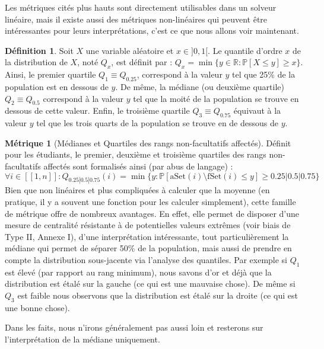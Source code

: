 \documentclass{rapport}
\theoremstyle{definition}
\newtheorem{definition}{Définition}
\theoremstyle{remark}
\theoremstyle{plain}
\theoremstyle{definition}
\newtheorem*{metric}{Métrique}
\theoremstyle{remark}
\newcommand{\llbracket}{[\![}
\newcommand{\rrbracket}{]\!]}
\begin{document}
Les métriques cités plus hauts sont directement utilisables dans un solveur linéaire, mais il existe aussi des métriques non-linéaires qui peuvent être intéressantes pour leurs interprétations, c'est ce que nous allons voir maintenant.

\begin{definition}
    Soit $X$ une variable aléatoire et $x\in]0,1[$. Le quantile d'ordre $x$ de la distribution de $X$, noté $Q_x$, est définit par : $Q_x = \min\{y\in\mathbb{R} : \mathbb{P}[X\le y]\ge x\}$.
    Ainsi, le premier quartile $Q_1 \equiv Q_{0.25}$, correspond à la valeur $y$ tel que 25\% de la population est en dessous de $y$. 
    De même, la médiane (ou deuxième quartile) $Q_2\equiv Q_{0.5}$ correspond à la valeur $y$ tel que la moité de la population se trouve en dessous de cette valeur.
    Enfin, le troisième quartile $Q_3\equiv Q_{0.75}$ équivaut à la valeur $y$ tel que les trois quarts de la population se trouve en de dessous de $y$. 
\end{definition}

\begin{metric}[Médianes et Quartiles des rangs non-facultatifs affectés]
    Définit pour les étudiants, le premier, deuxième et troisième quartiles des rangs non-facultatifs affectés sont formalisés ainsi (par abus de langage) :
    $$
    \forall i\in\llbracket 1, n\rrbracket : Q_{0.25|0.5|0.75}(i) = \min\{y : \mathbb{P}[\text{aSet}(i)\setminus\text{fSet}(i)\le y]\ge 0.25|0.5|0.75\}
    $$
    Bien que non linéaires et plus compliquées à calculer que la moyenne (en pratique, il y a souvent une fonction pour les calculer simplement), cette famille de métrique offre de nombreux avantages.
    En effet, elle permet de disposer d'une mesure de centralité résistante à de potentielles valeurs extrêmes (voir biais de Type II, Annexe I), 
    d'une interprétation intéressante, tout particulièrement la médiane qui permet de séparer 50\% de la population, 
    mais aussi de prendre en compte la distribution sous-jacente via l'analyse des quantiles. 
    Par exemple si $Q_1$ est élevé (par rapport au rang minimum), nous savons d'or et déjà que la distribution est étalé sur la gauche (ce qui est une mauvaise chose). 
    De même si $Q_3$ est faible nous observons que la distribution est étalé sur la droite (ce qui est une bonne chose).

    Dans les faits, nous n'irons généralement pas aussi loin et resterons sur l'interprétation de la médiane uniquement. 
\end{metric}
\end{document}
